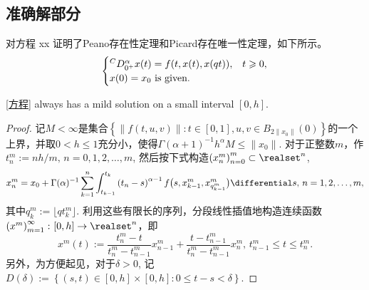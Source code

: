 \subsection{准确解部分}
对方程 xx 证明了Peano存在性定理和Picard存在唯一性定理，如下所示。
\begin{equation}\label{方程}
    \begin{cases}%
        \Caputo x(t) = f(t, x(t), x(qt)),&t\geqslant 0,\\
        x(0) = x_0 \text{ is given.}
    \end{cases}
\end{equation}
\begin{theorem}
    \cref{方程} always has a mild solution on a small interval $[0,h]$.
\end{theorem}
\begin{proof}
    记$M<\infty$是集合$\left\{\left\|f(t,u,v)\right\|\colon t\in [0,1], u,v\in B_{2\|x_0\|}(0)\right\}$的一个上界，并取$0<h\leqslant 1$充分小，使得$\Gamma(\alpha + 1)^{-1} h^\alpha M \leqslant \|x_0\|$. 对于正整数$m$，作$t^m_{n}:=nh/m,\,n=0,1,2,\dots,m$, 然后按下式构造$\left(x^m_{n}\right)_{n=0}^m\subset \realset^n$,
    \begin{equation}\label{PicardSequence}
        x^m_{n}=x_0+\Gamma(\alpha)^{-1}\sum_{k=1}^n\int_{t_{k-1}}^{t_k}\left(t_n-s\right)^{\alpha-1}f\bigl(s,x^m_{k-1},x^m_{q^m_{k-1}}\bigr)\differential s,\,n=1,2,\dots,m,
    \end{equation}
    其中$q^m_{k}:=\lfloor qt^m_k \rfloor$. 利用这些有限长的序列，分段线性插值地构造连续函数$\left(x^m\right)_{m=1}^\infty\colon[0,h]\to \realset^n$，即
    \begin{equation*}
        x^m(t):=\frac{t^m_n-t}{t^m_n-t^m_{n-1}}x^m_{n-1}+\frac{t-t^m_{n-1}}{t^m_n-t^m_{n-1}}x^m_{n},\,t^m_{n-1}\leqslant t\leqslant t^m_n.
    \end{equation*}
    另外，为方便起见，对于$\delta>0$, 记$D(\delta):=\left\{(s,t)\in [0,h]\times [0,h]\colon 0\leqslant t-s<\delta\right\}$.


\end{proof}
